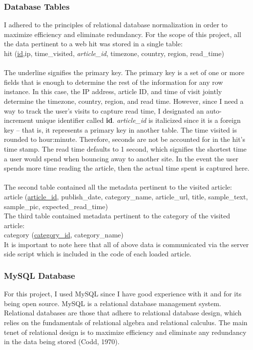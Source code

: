 \documentclass[12pt]{article}
\begin{document}
\subsubsection{Database Tables}
I adhered to the principles of relational database normalization in order to maximize efficiency and eliminate redundancy. For the scope of this project, all the data pertinent to a web hit was stored in a single table: \\ 
{\large{hit (\underline{id},ip, time\_visited, \textit{article\_id}, timezone, country, region, read\_time)}} \\ \\
The underline signifies the primary key. The primary key is a set of one or more fields that is enough to determine the rest of the information for any row instance. In this case, the IP address, article ID, and time of visit jointly determine the timezone, country, region, and read time. However, since I need a way to track the user's visits to capture read time, I designated an auto-increment unique identifier called \textbf{id}. \textit{article\_id} is italicized since it is a foreign key -- that is, it represents a primary key in another table. The time visited is rounded to hour:minute. Therefore, seconds are not be accounted for in the hit's time stamp. The read time defaults to 1 second, which signifies the shortest time a user would spend when bouncing away to another site. In the event the user spends more time reading the article, then the actual time spent is captured here.
\\ \\
The second table contained all the metadata pertinent to the visited article:\\
{\large{article (\underline{article\_id}, publish\_date, category\_name, article\_url, title, sample\_text, sample\_pic, expected\_read\_time)}} \\ 

\noindent The third table contained metadata pertinent to the category of the visited article:\\
{\large{category (\underline{category\_id}, category\_name})}
\\ 

It is important to note here that all of above data is communicated via the server side script which is included in the code of each loaded article. 

\subsubsection{MySQL Database}
For this project, I used MySQL since I have good experience with it and for its being open source. MySQL is a relational database management system. Relational databases are those that adhere to relational database design, which relies on the fundamentals of relational algebra and relational calculus. The main tenet of relational design is to maximize efficiency and eliminate any redundancy in the data being stored (Codd, 1970).
\end{document}
